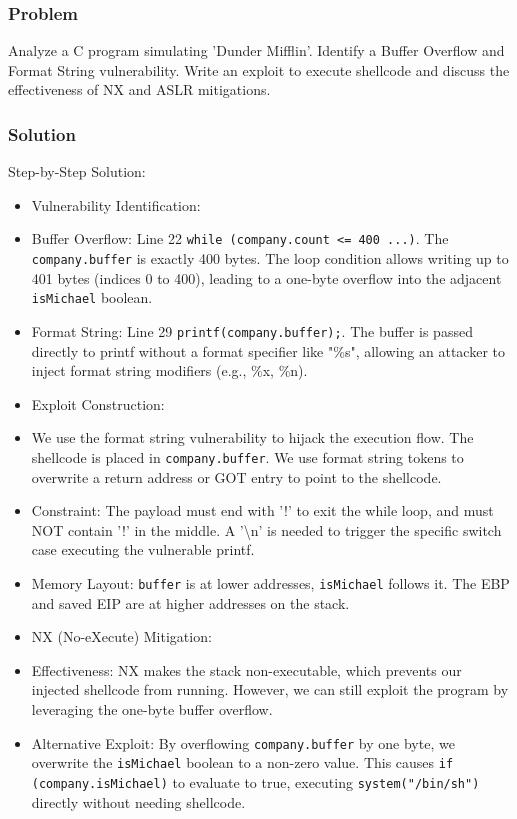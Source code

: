 \documentclass{article}
\begin{document}
\subsubsection*{Problem}
Analyze a C program simulating 'Dunder Mifflin'. Identify a Buffer Overflow and Format String vulnerability. Write an exploit to execute shellcode and discuss the effectiveness of NX and ASLR mitigations.

\subsubsection*{Solution}
Step-by-Step Solution:

\begin{itemize}
    \item[\textbf{1.}] Vulnerability Identification:
    \item Buffer Overflow: Line 22 \texttt{while (company.count <= 400 ...)}. The \texttt{company.buffer} is exactly 400 bytes. The loop condition allows writing up to 401 bytes (indices 0 to 400), leading to a one-byte overflow into the adjacent \texttt{isMichael} boolean.
    \item Format String: Line 29 \texttt{printf(company.buffer);}. The buffer is passed directly to printf without a format specifier like "\%s", allowing an attacker to inject format string modifiers (e.g., \%x, \%n).

    \item[\textbf{2.}] Exploit Construction:
    \item We use the format string vulnerability to hijack the execution flow. The shellcode is placed in \texttt{company.buffer}. We use format string tokens to overwrite a return address or GOT entry to point to the shellcode.
    \item Constraint: The payload must end with '!' to exit the while loop, and must NOT contain '!' in the middle. A '\textbackslash{}n' is needed to trigger the specific switch case executing the vulnerable printf.
    \item Memory Layout: \texttt{buffer} is at lower addresses, \texttt{isMichael} follows it. The EBP and saved EIP are at higher addresses on the stack.

    \item[\textbf{3.}] NX (No-eXecute) Mitigation:
    \item Effectiveness: NX makes the stack non-executable, which prevents our injected shellcode from running. However, we can still exploit the program by leveraging the one-byte buffer overflow.
    \item Alternative Exploit: By overflowing \texttt{company.buffer} by one byte, we overwrite the \texttt{isMichael} boolean to a non-zero value. This causes \texttt{if (company.isMichael)} to evaluate to true, executing \texttt{system("/bin/sh")} directly without needing shellcode.


\end{itemize}
\end{document}
